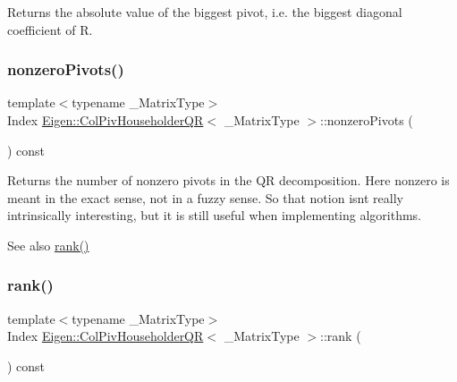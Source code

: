\begin{DoxyReturn}{Returns}
the absolute value of the biggest pivot, i.\+e. the biggest diagonal coefficient of R. 
\end{DoxyReturn}
\mbox{\label{class_eigen_1_1_col_piv_householder_q_r_a796610bab81f0527aa1ae440c71f58a4}} 
\subsubsection{\texorpdfstring{nonzeroPivots()}{nonzeroPivots()}}
{\footnotesize\ttfamily template$<$typename \+\_\+\+Matrix\+Type$>$ \\
Index \mbox{\hyperlink{class_eigen_1_1_col_piv_householder_q_r}{Eigen\+::\+Col\+Piv\+Householder\+QR}}$<$ \+\_\+\+Matrix\+Type $>$\+::nonzero\+Pivots (\begin{DoxyParamCaption}{ }\end{DoxyParamCaption}) const\hspace{0.3cm}{\ttfamily [inline]}}

\begin{DoxyReturn}{Returns}
the number of nonzero pivots in the QR decomposition. Here nonzero is meant in the exact sense, not in a fuzzy sense. So that notion isn\textquotesingle{}t really intrinsically interesting, but it is still useful when implementing algorithms.
\end{DoxyReturn}
\begin{DoxySeeAlso}{See also}
\mbox{\hyperlink{class_eigen_1_1_col_piv_householder_q_r_a2a59aaa689613ce5ef0c9130ad33940e}{rank()}} 
\end{DoxySeeAlso}
\mbox{\label{class_eigen_1_1_col_piv_householder_q_r_a2a59aaa689613ce5ef0c9130ad33940e}} 
\subsubsection{\texorpdfstring{rank()}{rank()}}
{\footnotesize\ttfamily template$<$typename \+\_\+\+Matrix\+Type$>$ \\
Index \mbox{\hyperlink{class_eigen_1_1_col_piv_householder_q_r}{Eigen\+::\+Col\+Piv\+Householder\+QR}}$<$ \+\_\+\+Matrix\+Type $>$\+::rank (\begin{DoxyParamCaption}{ }\end{DoxyParamCaption}) const\hspace{0.3cm}{\ttfamily [inline]}}


